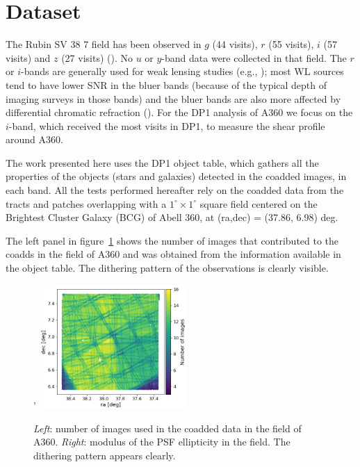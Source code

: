 \documentclass[SE,lsstdraft,authoryear,toc]{lsstdoc}
\begin{document}
\section{Dataset}
\label{sec:data}
The Rubin SV 38 7 field has been observed in $g$ (44 visits), $r$ (55 visits), $i$ (57 visits) and $z$ (27 visits) (). No $u$ or $y$-band data were collected in that field. The $r$ or $i$-bands are generally used for weak lensing studies (e.g., \citealp{2018MNRAS.481.3170M}); most WL sources tend to have lower SNR in the bluer bands (because of the typical depth of imaging surveys in those bands) and the bluer bands are also more affected by differential chromatic refraction (). For the DP1 analysis of A360 we focus on the $i$-band, which received the most visits in DP1, to measure the shear profile around A360. 

The work presented here uses the DP1 object table, which gathers all the properties of the objects (stars and galaxies) detected in the coadded images, in each band.
All the tests performed hereafter rely on the coadded data from the tracts and patches overlapping with a $1^\circ \times 1^\circ$ square field centered on the Brightest Cluster Galaxy (BCG) of Abell 360, at (ra,dec) = (37.86, 6.98) deg. 


 The left panel in figure~\ref{fig:dither} shows the number of images that contributed to the coadds in the field of A360 and was obtained from the  information available in the object table. The dithering pattern of the observations is clearly visible. 


\begin{figure}
\centering'
\includegraphics[width=0.5\textwidth]{Figures/nimages.png}
\caption{\emph{Left}: number of images used in the coadded data in the field of A360. \emph{Right}: modulus of the PSF ellipticity in the field. The dithering pattern appears clearly. {\color{red}}\label{fig:dither}}
\end{figure}
\end{document}
